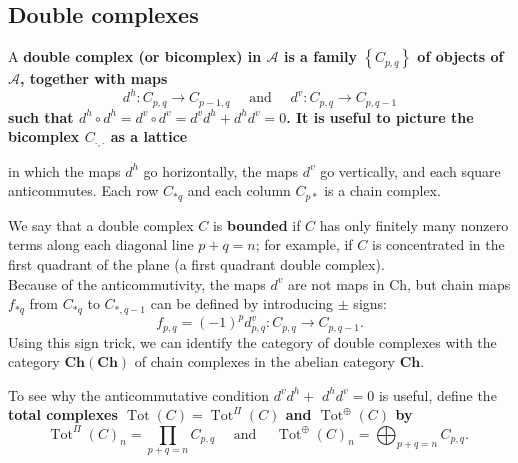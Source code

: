 \subsection{Double complexes}
A \bf{double complex} (or bicomplex) in $\mathcal{A}$ is a family $\left\{C_{p, q}\right\}$ of objects of $\mathcal{A}$, together with maps
$$
d^h: C_{p, q} \rightarrow C_{p-1, q} \quad \text { and } \quad d^v: C_{p, q} \rightarrow C_{p, q-1}
$$
such that $d^h \circ d^h=d^v \circ d^v=d^v d^h+d^h d^v=0$. It is useful to picture the bicomplex $C_{\cdot,\cdot}$ as a lattice 
\begin{center}
\end{center}
    in which the maps $d^h$ go horizontally, the maps $d^v$ go vertically, and each square anticommutes. Each row $C_{* q}$ and each column $C_{p *}$ is a chain complex.

We say that a double complex $C$ is \textbf{bounded} if $C$ has only finitely many nonzero terms along each diagonal line $p+q=n$; for example, if $C$ is concentrated in the first quadrant of the plane (a first quadrant double complex).\\
Because of the anticommutivity, the maps $d^v$ are not maps in Ch, but chain maps $f_{* q}$ from $C_{* q}$ to $C_{*, q-1}$ can be defined by introducing $\pm$ signs:
$$
f_{p, q}=(-1)^p d_{p, q}^v: C_{p, q} \rightarrow C_{p, q-1} .
$$
Using this sign trick, we can identify the category of double complexes with the category $\mathbf{C h}(\mathbf{C h})$ of chain complexes in the abelian category $\mathbf{C h}$.

To see why the anticommutative condition $d^v d^h+$ $d^h d^v=0$ is useful, define the \bf{total complexes} $\operatorname{Tot}(C)=\operatorname{Tot}^{\Pi}(C)$ and $\operatorname{Tot}^{\oplus}(C)$ by
$$
\operatorname{Tot}^{\Pi}(C)_n=\prod_{p+q=n} C_{p, q} \quad \text { and } \quad \operatorname{Tot}^{\oplus}(C)_n=\bigoplus_{p+q=n} C_{p, q} \text {. }
$$

